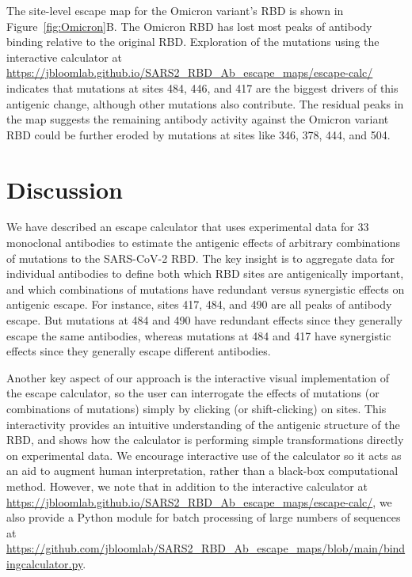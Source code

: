 \documentclass[9pt,twocolumn,twoside]{gsajnl_modified}
\begin{document}
The site-level escape map for the Omicron variant's RBD is shown in Figure~\ref{fig:Omicron}B.
The Omicron RBD has lost most peaks of antibody binding relative to the original RBD.
Exploration of the mutations using the interactive calculator at \url{https://jbloomlab.github.io/SARS2_RBD_Ab_escape_maps/escape-calc/} indicates that mutations at sites 484, 446, and 417 are the biggest drivers of this antigenic change, although other mutations also contribute.
The residual peaks in the map suggests the remaining antibody activity against the Omicron variant RBD could be further eroded by mutations at sites like 346, 378, 444, and 504.

\section{Discussion}
We have described an escape calculator that uses experimental data for 33 monoclonal antibodies to estimate the antigenic effects of arbitrary combinations of mutations to the SARS-CoV-2 RBD.
The key insight is to aggregate data for individual antibodies to define both which RBD sites are antigenically important, and which combinations of mutations have redundant versus synergistic effects on antigenic escape.
For instance, sites 417, 484, and 490 are all peaks of antibody escape.
But mutations at 484 and 490 have redundant effects since they generally escape the same antibodies, whereas mutations at 484 and 417 have synergistic effects since they generally escape different antibodies.

Another key aspect of our approach is the interactive visual implementation of the escape calculator, so the user can interrogate the effects of mutations (or combinations of mutations) simply by clicking (or shift-clicking) on sites.
This interactivity provides an intuitive understanding of the antigenic structure of the RBD, and shows how the calculator is performing simple transformations directly on experimental data.
We encourage interactive use of the calculator so it acts as an aid to augment human interpretation, rather than a black-box computational method.
However, we note that in addition to the interactive calculator at \url{https://jbloomlab.github.io/SARS2_RBD_Ab_escape_maps/escape-calc/}, we also provide a Python module for batch processing of large numbers of sequences at \url{https://github.com/jbloomlab/SARS2_RBD_Ab_escape_maps/blob/main/bindingcalculator.py}.
\end{document}
